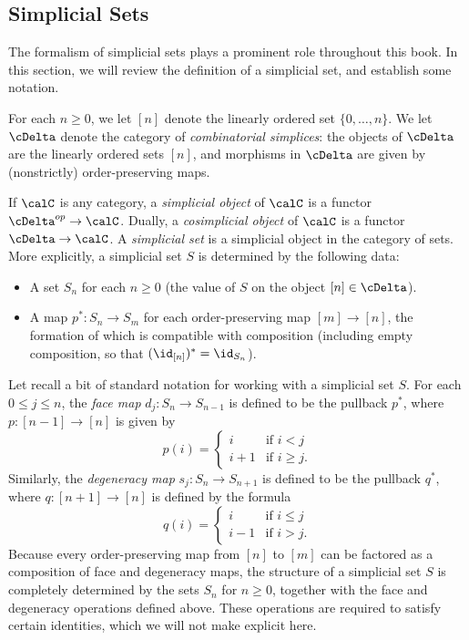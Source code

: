 \begin{Model Categories}
\begin{Didn't Read}
\subsection{Simplicial Sets}\label{simpset}

The formalism of simplicial sets plays a prominent role throughout this book. In this section, we will review the definition of a simplicial set, and establish some notation.

For each $n \geq 0$, we let
$[n]$ denote the linearly ordered set $\{ 0, \ldots, n \}$.
We let $\cDelta$ denote
the category of {\it combinatorial simplices}: the objects of
$\cDelta$ are the linearly ordered sets $[n]$, and morphisms
in $\cDelta$ are given by (nonstrictly) order-preserving maps.

If $\calC$ is any category, a {\it simplicial object} of $\calC$
is a functor $\cDelta^{op} \rightarrow \calC$. Dually, a {\it
cosimplicial object} of $\calC$ is a functor $\cDelta \rightarrow
\calC$. A {\it simplicial set} is a simplicial object in the
category of sets. More explicitly, a simplicial set $S$ is
determined by the following data:

\begin{itemize}
\item A set $S_{n}$ for each $n \geq 0$ (the value of $S$
on the object $[n] \in \cDelta$).

\item A map $p^{\ast}: S_n \rightarrow S_m$ for each
order-preserving map $[m] \rightarrow [n]$, the formation of which is compatible with composition
(including empty composition, so that
$( \id_{[n]} )^{\ast} = \id_{S_n}$).
\end{itemize}

Let recall a bit of standard notation for working with a
simplicial set $S$. For each $0 \leq j \leq n$, the {\it face map}
$d_j: S_n \rightarrow S_{n-1}$ is defined to
be the pullback $p^{\ast}$, where $p: [n-1] \rightarrow [n]$ is given by
$$p(i) =
\begin{cases} i & \text{if } i<j \\
i+1 & \text{if } i \geq j. \end{cases} $$ 
Similarly, the {\it degeneracy map} $s_j: S_{n} \rightarrow S_{n+1}$
is defined to be the pullback $q^{\ast}$, where $q: [n+1] \rightarrow [n]$ is defined by the formula
$$q(i) = \begin{cases} i & \text{if } i \leq j \\
i-1 & \text{if } i > j. \end{cases}$$
Because every order-preserving map from 
$[n]$ to $[m]$ can be factored as a composition of face and degeneracy maps, 
the structure of a simplicial set $S$ is completely determined by the sets
$S_n$ for $n \geq 0$, together with the face and degeneracy operations
defined above. These operations are required to satisfy certain identities, which we will not make explicit here.


\end{Didn't Read}
\end{Model Categories}
